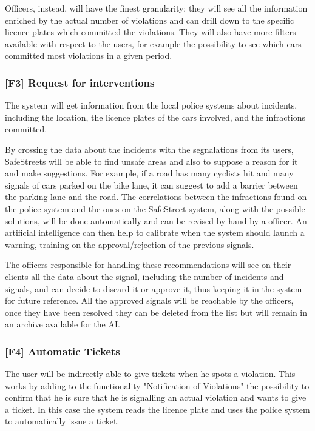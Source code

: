 Officers, instead, will have the finest granularity: they will see all the information enriched by the actual number of violations and can drill down to the specific licence plates which committed the violations.
They will also have more filters available with respect to the users, for example the possibility to see which cars committed most violations in a given period.

\subsubsection[]{[F3] Request for interventions\hypertarget{sec:f3}{}}
\label{sec:request_for_interventions}
The system will get information from the local police systems about incidents, including the location, the licence plates of the cars involved, and the infractions committed.

By crossing the data about the incidents with the segnalations from its users, SafeStreets will be able to find unsafe areas and also to suppose a reason for it and make suggestions.
For example, if a road has many cyclists hit and many signals of cars parked on the bike lane, it can suggest to add a barrier between the parking lane and the road.
The correlations between the infractions found on the police system and the ones on the SafeStreet system, along with the possible solutions, will be done automatically and can be revised by hand by a officer.
An artificial intelligence can then help to calibrate when the system should launch a warning, training on the approval/rejection of the previous signals.

The officers responsible for handling these recommendations will see on their clients all the data about the signal,
including the number of incidents and signals, and can decide to discard it or approve it, thus keeping it in the system for future reference.
All the approved signals will be reachable by the officers, once they have been resolved they can be deleted from the list but will remain in an archive available for the AI.


\subsubsection[]{[F4] Automatic Tickets\hypertarget{sec:f4}{}}
\label{sec:automatic_tickets}
The user will be indirectly able to give tickets when he spots a violation. This works by adding to the functionality
\hyperref[sec:notification_of_violations]{"Notification of Violations"}
the possibility to confirm that he is sure that he is signalling an actual violation and wants to give a ticket.
In this case the system reads the licence plate and uses the police system to automatically issue a ticket.

